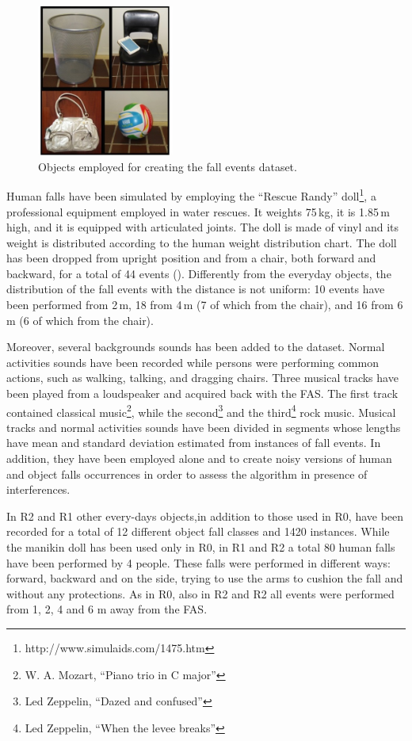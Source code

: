 \begin{figure}[t]
	\centering
	\includegraphics[width=0.4\textwidth]{img/oggetti_cadute3.jpeg}
	\caption{Objects employed for creating the fall events dataset.}\label{fig:objects}
\end{figure}

Human falls have been simulated by employing the ``Rescue Randy'' doll\footnote{http://www.simulaids.com/1475.htm}, a professional equipment employed in water rescues. It weights 75\,kg, it is 1.85\,m high, and it is equipped with articulated joints. The doll is made of vinyl and its weight is distributed according to the human weight distribution chart. The doll has been dropped from upright position and from a chair, both forward and backward, for a total of 44 events (). Differently from the everyday objects, the distribution of the fall events with the distance is not uniform: 10 events have been performed from 2\,m, 18 from 4\,m (7 of which from the chair), and 16 from 6\,m (6 of which from the chair).

Moreover, several backgrounds sounds has been added to the dataset. 
Normal activities sounds have been recorded while persons were performing common actions, such as walking, talking, and dragging chairs. Three musical tracks have been played from a loudspeaker and acquired back with the FAS. The first track contained classical music\footnote{W. A. Mozart, ``Piano trio in C major''}, while the second\footnote{Led Zeppelin, ``Dazed and confused''} and the third\footnote{Led Zeppelin, ``When the levee breaks''} rock music. Musical tracks and normal activities sounds have been divided in segments whose lengths have mean and standard deviation estimated from instances of fall events. In addition, they have been employed alone and to create noisy versions of human and object falls occurrences in order to assess the algorithm in presence of interferences. 

In R2 and R1 other every-days objects,in addition to those used in R0, have been recorded for a total of 12 different object fall classes and 1420 instances. While the manikin doll has been used only in R0, in R1 and R2 a total 80 human falls have been performed by 4 people. These falls were performed in different ways: forward, backward and on the side, trying to use the arms to cushion the fall and without any protections. As in R0, also in R2 and R2 all events were performed from 1, 2, 4 and 6 m away from the FAS.

